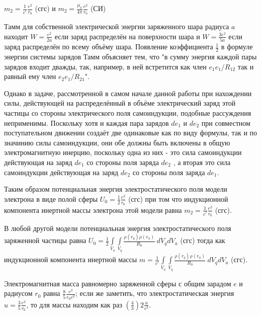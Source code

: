 \documentclass{article}
\begin{document}
$m_2 =\frac{1}{{{c}^{^{2}}}}\frac{e^2}{{{r}_{0}}}$ (сгс) и
$m_2 =\frac{{{\mu }_{0}}}{4\pi }\frac{e^2}{{{r}_{0}}}$ (СИ)


Тамм \cite{tamm} для собственной электрической энергии заряженного шара радиуса $a$ находит $W=\frac{e^2}{2a}$ если заряд распределён на поверхности шара и $W=\frac{3e^2}{5a}$ если заряд распределён по всему объёму шара. Появление коэффициента $\frac{1}{2}$  в формуле энергии системы зарядов Тамм объясняет тем, что "в сумму энергия каждой пары зарядов входит дважды, так, например, в ней встретится как член ${e_{1}}{e_{1}}/{R_{12}}$ так и равный ему член ${e_{2}}{e_{1}}/{R_{21}}$".

Однако в задаче, рассмотренной в самом начале данной работы при нахождении силы, действующей на распределённый в объёме электрический заряд этой частицы со стороны электрического поля самоиндукции, подобные рассуждения неприменимы. Поскольку хотя и каждая пара зарядов $d{e}_{1}$ и $d{e}_{2}$ при совместном поступательном движении создаёт две одинаковые как по виду формулы, так и по значинию силы самоиндукции, они обе должны быть включены в общую электромагнитную инерцию, поскольку одна из них - это сила самоиндукции действующая на заряд $d{e}_{1}$  со стороны поля заряда $d{e}_{2}$ , а вторая это сила самоиндукции действующая на заряд $d{e}_{2}$  со стороны поля заряда $d{e}_{1}$.

Таким образом потенциальная энергия электростатического поля модели электрона в виде полой сферы
${U}_{0} =\frac{1}{2}\frac{e^2}{{{r}_{0}}}$ (сгс)
при том что индукционной компонента инертной массы электрона этой модели равна
$m_2 =\frac{1}{{{c}^{^{2}}}}\frac{e^2}{{{r}_{0}}}$ (сгс).

В любой другой модели потенциальная энергия электростатического поля заряженной частицы равна
${U}_{0}=\frac{1}{2}\int\limits_{{{V}_{a}}}{\int\limits_{{{V}_{q}}}{\frac{\rho \left( {{r}_{q}} \right)\rho \left( {{r}_{a}} \right)}{R_{0}}}}\ d{{V}_{q}}d{{V}_{a}}$ (сгс)
тогда как индукционной компонента инертной массы
$m=\frac{1}{{{c}^{^{2}}}}\int\limits_{{{V}_{a}}}{\int\limits_{{{V}_{q}}}{\frac{\rho \left( {{r}_{q}} \right)\rho \left( {{r}_{a}} \right)}{R_{0}}}}\ d{{V}_{q}}d{{V}_{a}}$ (сгс).


Электромагнитная масса равномерно заряженной сферы с общим зарадом $e$ и радиусом $r_0$ равна $\frac{8}{5} \frac{e^2}{r_0 c^2}$; если же заметить, что электростатическая энергия $u = \frac{3}{5} \frac{e^2}{r_0}$, то для массы находим как раз $\left(\frac{4}{3}\right) 2 \frac{u}{c^2}$.
\end{document}
